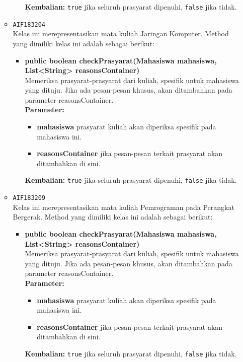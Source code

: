 \begin{enumerate}
\begin{itemize}
\begin{itemize}
\begin{itemize}
\end{itemize}
\textbf{Kembalian:} \texttt{true} jika seluruh prasyarat dipenuhi, \texttt{false} jika tidak.
\end{itemize}
\item \texttt{AIF183204} \\
Kelas ini merepresentasikan mata kuliah Jaringan Komputer. Method yang dimiliki kelas ini adalah sebagai berikut: 
\begin{itemize}
\item \textbf{public boolean checkPrasyarat(Mahasiswa mahasiswa, List<String> reasonsContainer)}\\
Memeriksa prasyarat-prasyarat dari kuliah, spesifik untuk mahasiswa yang dituju. Jika ada pesan-pesan khusus, akan ditambahkan pada parameter reasonsContainer.\\
\textbf{Parameter:}
\begin{itemize}
\item \textbf{mahasiswa} prasyarat kuliah akan diperiksa spesifik pada mahasiswa ini.
\item \textbf{reasonsContainer} jika pesan-pesan terkait prasyarat akan ditambahkan di sini.
\end{itemize}
\textbf{Kembalian:} \texttt{true} jika seluruh prasyarat dipenuhi, \texttt{false} jika tidak.
\end{itemize}
\item \texttt{AIF183209} \\
Kelas ini merepresentasikan mata kuliah Pemrograman pada Perangkat Bergerak. Method yang dimiliki kelas ini adalah sebagai berikut: 
\begin{itemize}
\item \textbf{public boolean checkPrasyarat(Mahasiswa mahasiswa, List<String> reasonsContainer)}\\
Memeriksa prasyarat-prasyarat dari kuliah, spesifik untuk mahasiswa yang dituju. Jika ada pesan-pesan khusus, akan ditambahkan pada parameter reasonsContainer.\\
\textbf{Parameter:}
\begin{itemize}
\item \textbf{mahasiswa} prasyarat kuliah akan diperiksa spesifik pada mahasiswa ini.
\item \textbf{reasonsContainer} jika pesan-pesan terkait prasyarat akan ditambahkan di sini.
\end{itemize}
\textbf{Kembalian:} \texttt{true} jika seluruh prasyarat dipenuhi, \texttt{false} jika tidak.
\end{itemize}

\end{itemize}
\end{enumerate}

